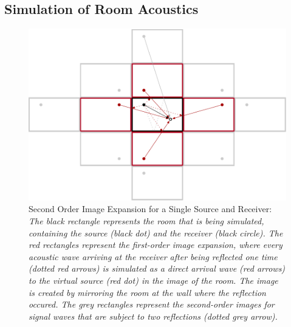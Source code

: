 \subsection{Simulation of Room Acoustics}
\label{sec:simulation}

\begin{figure}[!htb]
\centering
    \includegraphics[width=\textwidth]{data/figures/image-method3}
    \caption[Second Order Image Expansion for a Single Source and Receiver]{Second Order Image Expansion for a Single Source and Receiver: \itshape The black rectangle represents the room that is being simulated, containing the source (black dot) and the receiver (black circle). The red rectangles represent the first-order image expansion, where every acoustic wave arriving at the receiver after being reflected one time (dotted red arrows) is simulated as a direct arrival wave (red arrows) to the virtual source (red dot) in the image of the room. The image is created by mirroring the room at the wall where the reflection occured. The grey rectangles represent the second-order images for signal waves that are subject to two reflections (dotted grey arrow).}
    \label{fig:imageMethod}
\end{figure}

